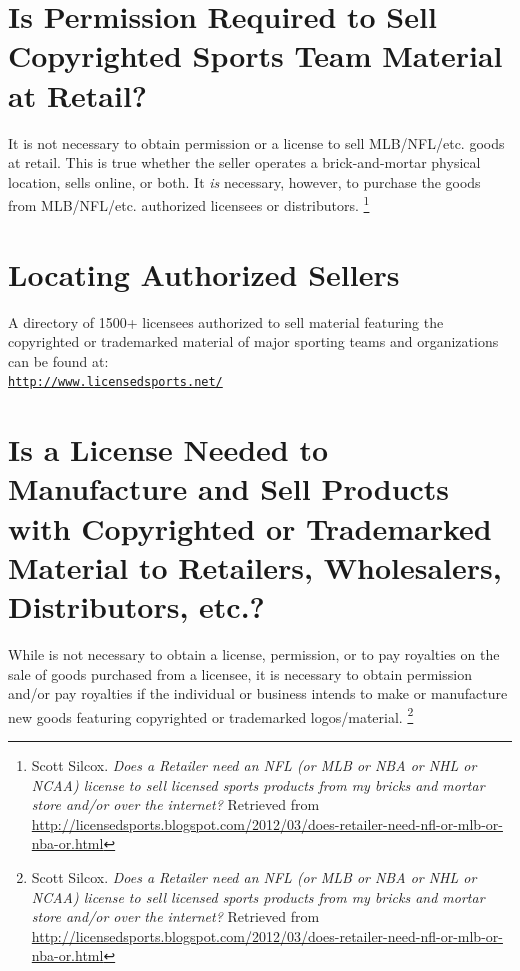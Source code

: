 \documentclass[letterpaper,11pt]{texMemo}
\begin{document}
\section*{Is Permission Required to Sell Copyrighted Sports Team Material at Retail?}
  It is not necessary to obtain permission or a license to sell MLB/NFL/etc. goods at retail. This is true whether the seller operates a brick-and-mortar physical location, sells online, or both. It \emph{is} necessary, however, to purchase the goods from MLB/NFL/etc. authorized licensees or distributors.
     \footnote{Scott Silcox. \emph{Does a Retailer need an NFL (or MLB or NBA or NHL or NCAA) license to sell licensed sports products from my bricks and mortar store and/or over the internet?} Retrieved from \href{http://licensedsports.blogspot.com/2012/03/does-retailer-need-nfl-or-mlb-or-nba-or.html}{http://licensedsports.blogspot.com/2012/03/does-retailer-need-nfl-or-mlb-or-nba-or.html}
    }
\section*{Locating Authorized Sellers}
	A directory of 1500+ licensees authorized to sell material featuring the copyrighted or trademarked material of major sporting teams and organizations can be found at:\\
  \texttt{\href{http://www.licensedsports.net/}{http://www.licensedsports.net/}}

\section*{Is a License Needed to Manufacture and Sell Products with Copyrighted or Trademarked Material to Retailers, Wholesalers, Distributors, etc.?}
  While is not necessary to obtain a license, permission, or to pay royalties on the sale of goods purchased from a licensee, it is necessary to obtain permission and/or pay royalties if the individual or business intends to make or manufacture new goods featuring copyrighted or trademarked logos/material.
    \footnote{Scott Silcox. \emph{Does a Retailer need an NFL (or MLB or NBA or NHL or NCAA) license to sell licensed sports products from my bricks and mortar store and/or over the internet?} Retrieved from \href{http://licensedsports.blogspot.com/2012/03/does-retailer-need-nfl-or-mlb-or-nba-or.html}{http://licensedsports.blogspot.com/2012/03/does-retailer-need-nfl-or-mlb-or-nba-or.html}

    }
\end{document}
